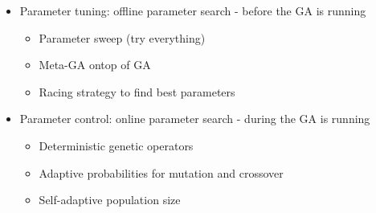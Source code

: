             \begin{itemize}
                \item Parameter tuning: offline parameter search - before the GA is running
                \begin{itemize}
                    \item Parameter sweep (try everything)
                    \item Meta-GA ontop of GA
                    \item Racing strategy to find best parameters
                \end{itemize}
                \item Parameter control: online parameter search - during the GA is running
                \begin{itemize}
                    \item Deterministic genetic operators
                    \item Adaptive probabilities for mutation and crossover
                    \item Self-adaptive population size
                \end{itemize}
            \end{itemize}
